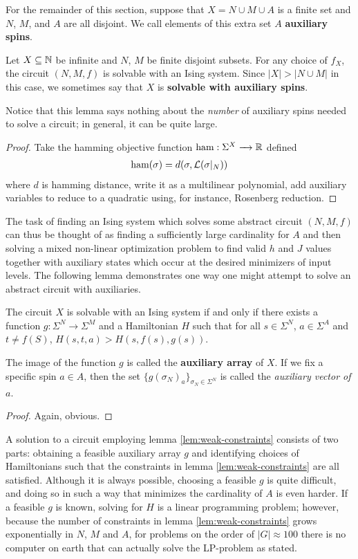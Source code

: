 \documentclass{article}
\begin{document}
For the remainder of this section, suppose that $X = N \cup M \cup A$ is a finite set and $N$, $M$, and $A$ are all disjoint. We call elements of this extra set $A$ \textbf{auxiliary spins}.

\begin{prop}\label{prop:all-circuits-solvable-with-auxiliaries}
  Let $X \subseteq \mathbb{N}$ be infinite and $N$, $M$ be finite disjoint subsets. For any choice of $f_X$, the circuit $(N, M, f)$ is solvable with an Ising system. Since $|X| > |N\cup M|$ in this case, we sometimes say that $X$ is \textbf{solvable with auxiliary spins}.
\end{prop}
Notice that this lemma says nothing about the \emph{number} of auxiliary spins needed to solve a circuit; in general, it can be quite large.
\begin{proof}
  Take the hamming objective function $\text{ham}:\Sigma^X \to \bR$ defined
  \begin{align*}
    \text{ham}(\sigma) = d(\sigma, \mathcal{L}(\sigma|_N))
  \end{align*}
  where $d$ is hamming distance, write it as a multilinear polynomial, add auxiliary variables to reduce to a quadratic using, for instance, Rosenberg reduction.
\end{proof}

The task of finding an Ising system which solves some abstract circuit $(N, M, f)$ can thus be thought of as finding a sufficiently large cardinality for $A$ and then solving a mixed non-linear optimization problem to find valid $h$ and $J$ values together with auxiliary states which occur at the desired minimizers of input levels. The following lemma demonstrates one way one might attempt to solve an abstract circuit with auxiliaries. 

\begin{lem}\label{lem:weak-constraints}
  The circuit $X$ is solvable with an Ising system if and only if there exists a function $g:\Sigma^N \to \Sigma^M$ and a Hamiltonian $H$ such that for all $s \in \Sigma^N$, $a \in \Sigma^A$ and $t \neq f(S)$, $H(s,t,a) > H(s, f(s), g(s))$.
\end{lem}
The image of the function $g$ is called the \textbf{auxiliary array} of $X$. If we fix a specific spin $a \in A$, then the set $\{g(\sigma_N)_a\}_{\sigma_N \in \Sigma^N}$ is called the \emph{auxiliary vector of $a$}.
\begin{proof}
  Again, obvious.
\end{proof}

A solution to a circuit employing lemma \ref{lem:weak-constraints} consists of two parts: obtaining a feasible auxiliary array $g$ and identifying choices of Hamiltonians such that the constraints in lemma \ref{lem:weak-constraints} are all satisfied. Although it is always possible, choosing a feasible $g$ is quite difficult, and doing so in such a way that minimizes the cardinality of $A$ is even harder. If a feasible $g$ is known, solving for $H$ is a linear programming problem; however, because the number of constraints in lemma \ref{lem:weak-constraints} grows exponentially in $N$, $M$ and $A$, for problems on the order of $|G| \approx 100$ there is no computer on earth that can actually solve the LP-problem as stated.
\end{document}
